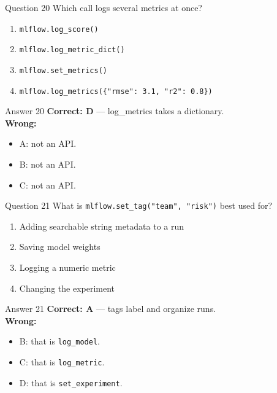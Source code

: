 \documentclass[aspectratio=169,11pt]{beamer}
\begin{document}
\begin{frame}{Question 20}
Which call logs several metrics at once?
\begin{enumerate}[label=\Alph*.]
\item \texttt{mlflow.log\_score()}
\item \texttt{mlflow.log\_metric\_dict()}
\item \texttt{mlflow.set\_metrics()}
\item \texttt{mlflow.log\_metrics(\{"rmse": 3.1, "r2": 0.8\})}
\end{enumerate}
\end{frame}
\begin{frame}{Answer 20}
\textbf{Correct: D} --- log\_metrics takes a dictionary.\\
\vspace{0.5em}
\textbf{Wrong:}
\begin{itemize}
\item A: not an API.
\item B: not an API.
\item C: not an API.
\end{itemize}
\end{frame}

\begin{frame}{Question 21}
What is \texttt{mlflow.set\_tag("team", "risk")} best used for?
\begin{enumerate}[label=\Alph*.]
\item Adding searchable string metadata to a run
\item Saving model weights
\item Logging a numeric metric
\item Changing the experiment
\end{enumerate}
\end{frame}
\begin{frame}{Answer 21}
\textbf{Correct: A} --- tags label and organize runs.\\
\vspace{0.5em}
\textbf{Wrong:}
\begin{itemize}
\item B: that is \texttt{log\_model}.
\item C: that is \texttt{log\_metric}.
\item D: that is \texttt{set\_experiment}.
\end{itemize}
\end{frame}
\end{document}

